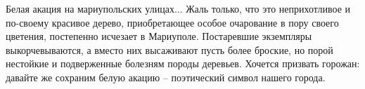 Белая акация на мариупольских улицах... Жаль только, что это неприхотливое и
по-своему красивое дерево, приобретающее особое очарование в пору своего
цветения, постепенно исчезает в Мариуполе. Постаревшие экземпляры
выкорчевываются, а вместо них высаживают пусть более броские, но порой
нестойкие и подверженные болезням породы деревьев. Хочется призвать горожан:
давайте же сохраним белую акацию – поэтический символ нашего города.
